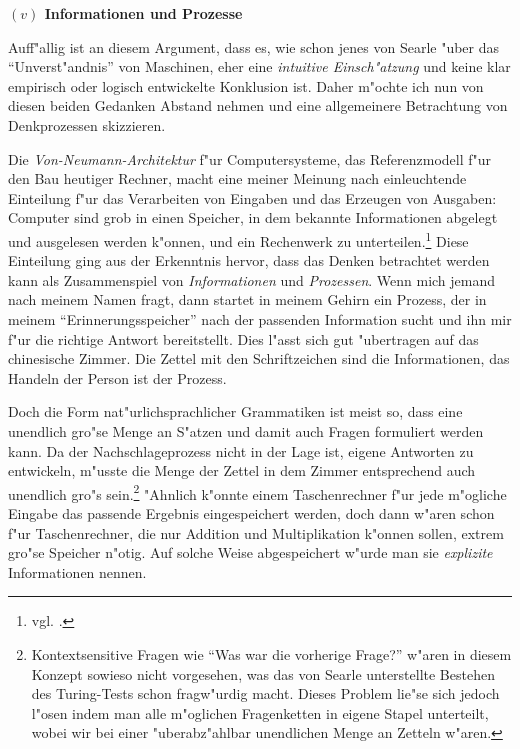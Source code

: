 \documentclass[a4paper, emulatestandardclasses, 12pt]{scrartcl}
\begin{document}
\begin{onehalfspace}
\vspace{5mm}
\noindent\textbf{$(v)$ Informationen und Prozesse}

\noindent Auff"allig ist an diesem Argument, dass es, wie schon jenes von Searle "uber das "`Unverst"andnis"' von Maschinen, eher eine \emph{intuitive Einsch"atzung} und keine klar empirisch oder logisch entwickelte Konklusion ist. Daher m"ochte ich nun von diesen beiden Gedanken Abstand nehmen und eine allgemeinere Betrachtung von Denkprozessen skizzieren.

Die \emph{Von-Neumann-Architektur} f"ur Computersysteme, das Referenzmodell f"ur den Bau heutiger Rechner, macht eine meiner Meinung nach einleuchtende Einteilung f"ur das Verarbeiten von Eingaben und das Erzeugen von Ausgaben: Computer sind grob in einen Speicher, in dem bekannte Informationen abgelegt und ausgelesen werden k"onnen, und ein Rechenwerk zu unterteilen.\footnote{vgl. \cite{von1993first}.} Diese Einteilung ging aus der Erkenntnis hervor, dass das Denken betrachtet werden kann als Zusammenspiel von \emph{Informationen} und \emph{Prozessen}. Wenn mich jemand nach meinem Namen fragt, dann startet in meinem Gehirn ein Prozess, der in meinem "`Erinnerungsspeicher"' nach der passenden Information sucht und ihn mir f"ur die richtige Antwort bereitstellt. Dies l"asst sich gut "ubertragen auf das chinesische Zimmer. Die Zettel mit den Schriftzeichen sind die Informationen, das Handeln der Person ist der Prozess. 

Doch die Form nat"urlichsprachlicher Grammatiken ist meist so, dass eine unendlich gro"se Menge an S"atzen und damit auch Fragen formuliert werden kann. Da der Nachschlageprozess nicht in der Lage ist, eigene Antworten zu entwickeln, m"usste die Menge der Zettel in dem Zimmer entsprechend auch unendlich gro"s sein.\footnote{Kontextsensitive Fragen wie "`Was war die vorherige Frage?"' w"aren in diesem Konzept sowieso nicht vorgesehen, was das von Searle unterstellte Bestehen des Turing-Tests schon fragw"urdig macht. Dieses Problem lie"se sich jedoch l"osen indem man alle m"oglichen Fragenketten in eigene Stapel unterteilt, wobei wir bei einer "uberabz"ahlbar unendlichen Menge an Zetteln w"aren.} "Ahnlich k"onnte einem Taschenrechner f"ur jede m"ogliche Eingabe das passende Ergebnis eingespeichert werden, doch dann w"aren schon f"ur Taschenrechner, die nur Addition und Multiplikation k"onnen sollen, extrem gro"se Speicher n"otig. Auf solche Weise abgespeichert w"urde man sie \emph{explizite} Informationen nennen.


\end{onehalfspace}
\end{document}
